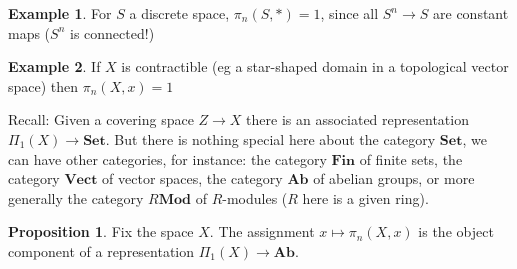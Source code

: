 \documentclass{tufte-handout}
\def\Set {\mathbf{Set}}
\def\Mod {\mathbf{Mod}}
\def\Ab {\mathbf{Ab}}
\def\Fin {\mathbf{Fin}}
\def\Vect {\mathbf{Vect}}
\theoremstyle{definition}
\newtheorem{prop}{Proposition}
\newtheorem{example}{Example}
\begin{document}
\begin{example}
For $S$ a discrete space, $\pi_n(S,*) = 1$, since all $S^n \to S$ are constant maps ($S^n$ is connected!)
\end{example}

\begin{example}
If $X$ is contractible (eg a star-shaped domain in a topological vector space) then $\pi_n(X,x) = 1$
\end{example}

Recall: Given a covering space $Z\to X$ there is an associated representation $\Pi_1(X) \to \Set$. But there is nothing special here about the category $\Set$, we can have other categories, for instance: the category $\Fin$ of finite sets, the category $\Vect$ of vector spaces, the category $\Ab$ of abelian groups, or more generally the category $R\Mod$ of $R$-modules ($R$ here is a given ring).


\begin{prop}
Fix the space $X$. The assignment $x\mapsto \pi_n(X,x)$ is the object component of a representation $\Pi_1(X) \to \Ab$.
\end{prop}
\end{document}

